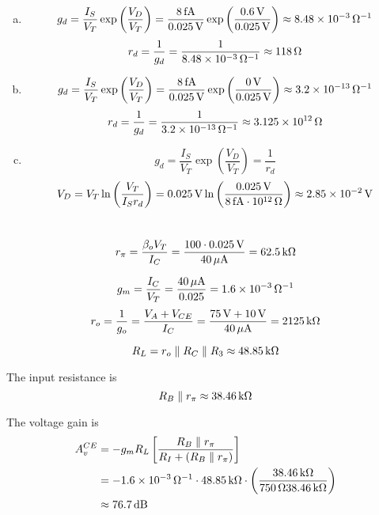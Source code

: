 \documentclass{article}
\newcommand{\unit}[1]{{\rm\,#1}}
\begin{document}
\section{}
\begin{enumerate}[(a)]
\item $$g_d=\frac{I_S}{V_T}\exp\left(\frac{V_D}{V_T}\right)=\frac{8\unit{fA}}{0.025\unit{V}}\exp\left(\frac{0.6\unit{V}}{0.025\unit{V}}\right)\approx8.48\times10^{-3}\unit{\Omega^{-1}}$$
$$r_d=\frac{1}{g_d}=\frac{1}{8.48\times10^{-3}\unit{\Omega^{-1}}}\approx118\unit{\Omega}$$
\item $$g_d=\frac{I_S}{V_T}\exp\left(\frac{V_D}{V_T}\right)=\frac{8\unit{fA}}{0.025\unit{V}}\exp\left(\frac{0\unit{V}}{0.025\unit{V}}\right)\approx3.2\times10^{-13}\unit{\Omega^{-1}}$$
$$r_d=\frac{1}{g_d}=\frac{1}{3.2\times10^{-13}\unit{\Omega^{-1}}}\approx3.125\times10^{12}\unit{\Omega}$$
\item $$g_d=\frac{I_S}{V_T}\exp\left(\frac{V_D}{V_T}\right)=\frac{1}{r_d}$$
$$V_D=V_T\ln\left(\frac{V_T}{I_Sr_d}\right)=0.025\unit{V}\ln\left(\frac{0.025\unit{V}}{8\unit{fA}\cdot10^{12}\unit{\Omega}}\right)\approx2.85\times10^{-2}\unit{V}$$
\end{enumerate}

\section{}
$$r_\pi=\frac{\beta_oV_T}{I_C}=\frac{100\cdot0.025\unit{V}}{40\unit{\mu A}}=62.5\unit{k\Omega}$$

$$g_m=\frac{I_C}{V_T}=\frac{40\unit{\mu A}}{0.025}=1.6\times10^{-3}\unit{\Omega^{-1}}$$
$$r_o=\frac{1}{g_o}=\frac{V_A+V_{CE}}{I_C}=\frac{75\unit{V}+10\unit{V}}{40\unit{\mu A}}=2125\unit{k\Omega}$$

$$R_L=r_o\parallel R_C\parallel R_3\approx48.85\unit{k\Omega}$$

The input resistance is
$$R_B\parallel r_\pi\approx38.46\unit{k\Omega}$$

The voltage gain is
\begin{align*}
A_v^{CE}&=-g_mR_L\left[\frac{R_B\parallel r_\pi}{R_I+(R_B\parallel r_\pi)}\right]\\
&=-1.6\times10^{-3}\unit{\Omega^{-1}}\cdot48.85\unit{k\Omega}\cdot\left(\frac{38.46\unit{k\Omega}}{750\unit{\Omega}38.46\unit{k\Omega}}\right)\\
&\approx76.7\unit{dB}
\end{align*}
\end{document}

